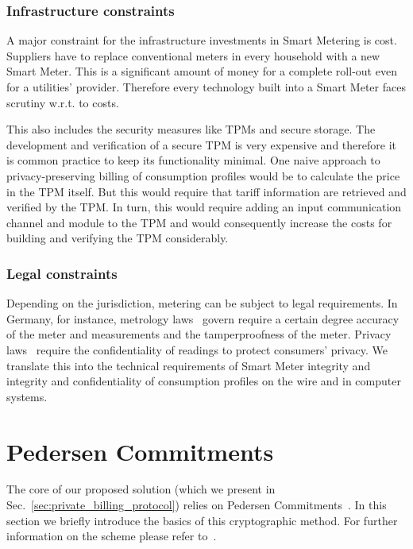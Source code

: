 \documentclass[english]{llncs}
\begin{document}
\subsubsection{Infrastructure constraints}
\label{infrastructure_req}



A major constraint for the infrastructure investments in Smart Metering is cost.
Suppliers have to replace conventional meters in every household with a new Smart Meter.
This is a significant amount of money for a complete roll-out even for a utilities' provider.
Therefore every technology built into a Smart Meter faces scrutiny w.r.t. to costs.

This also includes the security measures like TPMs and secure storage.
The development and verification of a secure TPM is very expensive and therefore it is common practice to keep its functionality minimal.
One naive approach to privacy-preserving billing of consumption profiles would be to calculate the price in the TPM itself.
But this would require that tariff information are retrieved and verified by the TPM.
In turn, this would require adding an input communication channel and module to the TPM and would consequently increase the costs for building and verifying the TPM considerably.

\subsubsection{Legal constraints}
\label{legal_req}
Depending on the jurisdiction, metering can be subject to legal requirements. In Germany, for instance, metrology laws~\cite{eichg} govern require a certain degree accuracy of the meter and measurements and the tamperproofness of the meter. Privacy laws~\cite{datenschutzg} require the confidentiality of readings to protect consumers' privacy.
We translate this into the technical requirements of Smart Meter integrity and integrity and confidentiality of consumption profiles on the wire and in computer systems.

\section{Pedersen Commitments}
\label{cryptoprimitives}

The core of our proposed solution (which we present in Sec.~\ref{sec:private_billing_protocol}) relies on Pedersen Commitments~\cite{Ped}.
In this section we briefly introduce the basics of this cryptographic method.
For further information on the scheme please refer to~\cite{Ped}.
\end{document}
